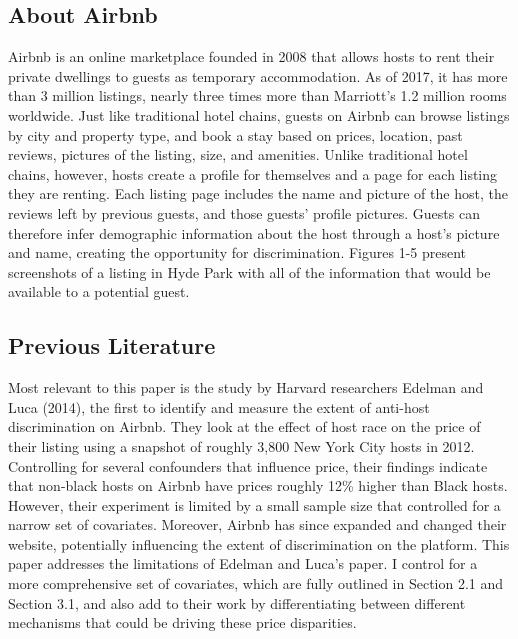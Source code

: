 \documentclass[11pt, oneside]{article}
\begin{document}



\subsection{About Airbnb} %
Airbnb is an online marketplace founded in 2008 that allows hosts to rent their private dwellings to guests as temporary accommodation. As of 2017, it has more than 3 million listings, nearly three times more than Marriott's 1.2 million rooms worldwide.\cite{aboutus} Just like traditional hotel chains, guests on Airbnb can browse listings by city and property type, and book a stay based on prices, location, past reviews, pictures of the listing, size, and amenities. Unlike traditional hotel chains, however, hosts create a profile for themselves and a page for each listing they are renting. Each listing page includes the name and picture of the host, the reviews left by previous guests, and those guests' profile pictures. Guests can therefore infer demographic information about the host through a host's picture and name, creating the opportunity for discrimination. Figures 1-5 present screenshots of a listing in Hyde Park with all of the information that would be available to a potential guest. 


\subsection{Previous Literature} %

Most relevant to this paper is the study by Harvard researchers Edelman and Luca (2014), the first to identify and measure the extent of anti-host discrimination on Airbnb.\cite{edelman} They look at the effect of host race on the price of their listing using a snapshot of roughly 3,800 New York City hosts in 2012. Controlling for several confounders that influence price, their findings indicate that non-black hosts on Airbnb have prices roughly 12\% higher than Black hosts. However, their experiment is limited by a small sample size that controlled for a narrow set of covariates. Moreover, Airbnb has since expanded and changed their website, potentially influencing the extent of discrimination on the platform. This paper addresses the limitations of Edelman and Luca's paper. I control for a more comprehensive set of covariates, which are fully outlined in Section 2.1 and Section 3.1, and also add to their work by differentiating between different mechanisms that could be driving these price disparities. 
\end{document}
